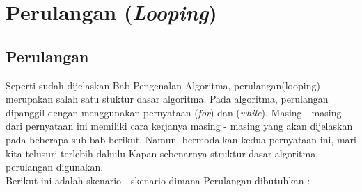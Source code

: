 \chapter{Perulangan (\textit{Looping})}

\section{Perulangan}
Seperti sudah dijelaskan Bab Pengenalan Algoritma, perulangan(looping) merupakan salah satu stuktur dasar algoritma. Pada algoritma, perulangan dipanggil dengan menggunakan pernyataan (\textit{for}) dan (\textit{while}). Masing - masing dari pernyataan ini memiliki cara kerjanya masing - masing yang akan dijelaskan pada beberapa sub-bab berikut. Namun, bermodalkan kedua pernyataan ini, mari kita telusuri terlebih dahulu Kapan sebenarnya struktur dasar algoritma perulangan digunakan.  \\
Berikut ini adalah skenario - skenario dimana Perulangan dibutuhkan : 
